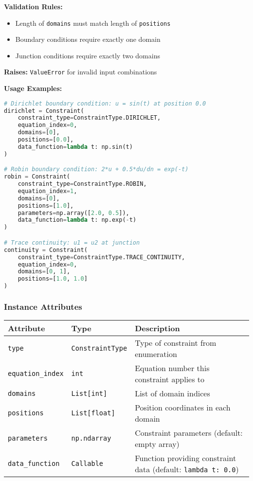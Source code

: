 \textbf{Validation Rules:}
\begin{itemize}
    \item Length of \texttt{domains} must match length of \texttt{positions}
    \item Boundary conditions require exactly one domain
    \item Junction conditions require exactly two domains
\end{itemize}

\textbf{Raises:} \texttt{ValueError} for invalid input combinations

\textbf{Usage Examples:}
\begin{lstlisting}[language=Python, caption=Constraint Constructor Usage]
# Dirichlet boundary condition: u = sin(t) at position 0.0
dirichlet = Constraint(
    constraint_type=ConstraintType.DIRICHLET,
    equation_index=0,
    domains=[0],
    positions=[0.0],
    data_function=lambda t: np.sin(t)
)

# Robin boundary condition: 2*u + 0.5*du/dn = exp(-t)
robin = Constraint(
    constraint_type=ConstraintType.ROBIN,
    equation_index=1,
    domains=[0],
    positions=[1.0],
    parameters=np.array([2.0, 0.5]),
    data_function=lambda t: np.exp(-t)
)

# Trace continuity: u1 = u2 at junction
continuity = Constraint(
    constraint_type=ConstraintType.TRACE_CONTINUITY,
    equation_index=0,
    domains=[0, 1],
    positions=[1.0, 1.0]
)
\end{lstlisting}

\subsubsection{Instance Attributes}

\begin{longtable}{|p{3.5cm}|p{2.5cm}|p{7cm}|}
\hline
\textbf{Attribute} & \textbf{Type} & \textbf{Description} \\
\hline
\endhead

\texttt{type} & \texttt{ConstraintType} & Type of constraint from enumeration \\
\hline

\texttt{equation\_index} & \texttt{int} & Equation number this constraint applies to \\
\hline

\texttt{domains} & \texttt{List[int]} & List of domain indices \\
\hline

\texttt{positions} & \texttt{List[float]} & Position coordinates in each domain \\
\hline

\texttt{parameters} & \texttt{np.ndarray} & Constraint parameters (default: empty array) \\
\hline

\texttt{data\_function} & \texttt{Callable} & Function providing constraint data (default: \texttt{lambda t: 0.0}) \\
\hline

\end{longtable}

